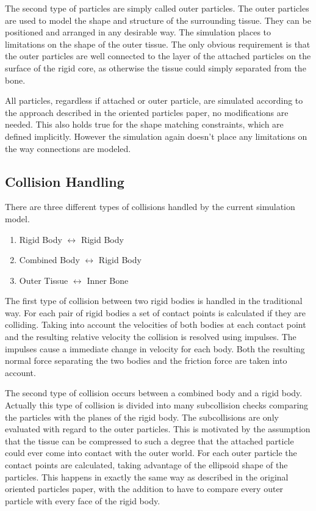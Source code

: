 The second type of particles are simply called outer particles. The outer particles are used to model the shape and structure of the surrounding tissue. They can be positioned and arranged in any desirable way. The simulation places to limitations on the shape of the outer tissue. The only obvious requirement is that the outer particles are well connected to the layer of the attached particles on the surface of the rigid core, as otherwise the tissue could simply separated from the bone.

All particles, regardless if attached or outer particle, are simulated according to the approach described in the oriented particles paper, no modifications are needed. This also holds true for the shape matching constraints, which are defined implicitly. However the simulation again doesn't place any limitations on the way connections are modeled.

\subsection{Collision Handling}
\label{subsec:collision_handling}

There are three different types of collisions handled by the current simulation model.

\begin{enumerate}
\item Rigid Body $\leftrightarrow$ Rigid Body
\item Combined Body $\leftrightarrow$ Rigid Body
\item Outer Tissue $\leftrightarrow$ Inner Bone
\end{enumerate}

The first type of collision between two rigid bodies is handled in the traditional way. For each pair of rigid bodies a set of contact points is calculated if they are colliding. Taking into account the velocities of both bodies at each contact point and the resulting relative velocity the collision is resolved using impulses. The impulses cause a immediate change in velocity for each body. Both the resulting normal force separating the two bodies and the friction force are taken into account.

The second type of collision occurs between a combined body and a rigid body. Actually this type of collision is divided into many subcollision checks comparing the particles with the planes of the rigid body. The subcollisions are only evaluated with regard to the outer particles. This is motivated by the assumption that the tissue can be compressed to such a degree that the attached particle could ever come into contact with the outer world. For each outer particle the contact points are calculated, taking advantage of the ellipsoid shape of the particles. This happens in exactly the same way as described in the original oriented particles paper, with the addition to have to compare every outer particle with every face of the rigid body. 

